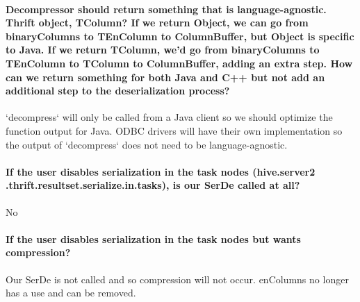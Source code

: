 \documentclass[11pt,a4paper]{article}
\begin{document}
	\paragraph{Decompressor should return something that is language-agnostic. Thrift object, TColumn? If we return Object, we can go from binaryColumns to TEnColumn to ColumnBuffer, but Object is specific to Java. If we return TColumn, we'd go from binaryColumns to TEnColumn to TColumn to ColumnBuffer, adding an extra step. How can we return something for both Java and C++ but not add an additional step to the deserialization process?}
	`decompress` will only be called from a Java client so we should optimize the function output for Java. ODBC drivers will have their own implementation so the output of `decompress` does not need to be language-agnostic.
	
	\paragraph{If the user disables serialization in the task nodes (hive.server2 .thrift.resultset.serialize.in.tasks), is our SerDe called at all?}
	No
	
	\paragraph{If the user disables serialization in the task nodes but wants compression?}
	Our SerDe is not called and so compression will not occur. enColumns no longer has a use and can be removed.
\end{document}

